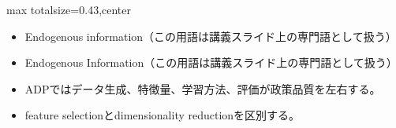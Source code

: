 \clearpage
{}
\begin{minipage}[t]{0.405\textwidth}
\begin{adjustbox}{max totalsize={\textwidth}{0.43\textheight},center}
\begin{minipage}{\textwidth}\scriptsize
{}\begin{itemize}
\item Endogenous information（この用語は講義スライド上の専門語として扱う）
\item Endogenous Information（この用語は講義スライド上の専門語として扱う）
\end{itemize}\begin{itemize}
\item ADPではデータ生成、特徴量、学習方法、評価が政策品質を左右する。
\item feature selectionとdimensionality reductionを区別する。
\end{itemize}
\end{minipage}
\end{adjustbox}
\end{minipage}\hfill
